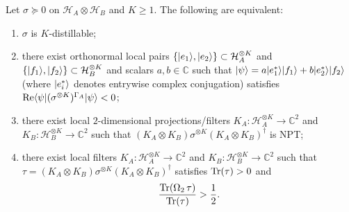 \begin{lemma}
\label{lem:two-qubit-filter}
\leanok
{}
Let $\sigma\succeq 0$ on $\mathcal{H}_A\otimes\mathcal{H}_B$ and $K\ge 1$. The following are equivalent:
\begin{enumerate}
  \item $\sigma$ is $K$-distillable;
  \item there exist orthonormal local pairs $\{|e_1\rangle,|e_2\rangle\}\subset\mathcal{H}_A^{\otimes K}$ and $\{|f_1\rangle,|f_2\rangle\}\subset\mathcal{H}_B^{\otimes K}$ and scalars $a,b\in\mathbb{C}$ such that $|\psi\rangle = a|e_1^*\rangle|f_1\rangle + b|e_2^*\rangle|f_2\rangle$ (where $|e_i^*\rangle$ denotes entrywise complex conjugation) satisfies $\operatorname{Re}\langle \psi|(\sigma^{\otimes K})^{\Gamma_A}|\psi\rangle < 0$;
  \item there exist local $2$-dimensional projections/filters $K_A : \mathcal{H}_A^{\otimes K}\to\mathbb{C}^2$ and $K_B : \mathcal{H}_B^{\otimes K}\to\mathbb{C}^2$ such that $(K_A\otimes K_B)\sigma^{\otimes K}(K_A\otimes K_B)^{\dagger}$ is NPT;
  \item there exist local filters $K_A : \mathcal{H}_A^{\otimes K}\to\mathbb{C}^2$ and $K_B : \mathcal{H}_B^{\otimes K}\to\mathbb{C}^2$ such that $\tau = (K_A\otimes K_B)\sigma^{\otimes K}(K_A\otimes K_B)^{\dagger}$ satisfies $\operatorname{Tr}(\tau) > 0$ and
  \[
    \frac{\operatorname{Tr}(\Omega_2\,\tau)}{\operatorname{Tr}(\tau)} > \frac{1}{2}.
  \]
\end{enumerate}
\end{lemma}
